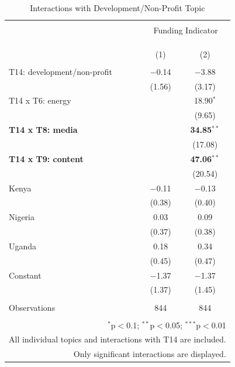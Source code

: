 \documentclass[12pt]{article}
\begin{document}
\begin{table}[!htbp] \centering 
  \caption{Interactions with Development/Non-Profit Topic} 
  \label{} 
\scriptsize 
\begin{tabular}{@{\extracolsep{5pt}}lcc} 
\\[-1.8ex]\hline 
\hline \\[-1.8ex] 
 & \multicolumn{2}{c}{Funding Indicator} \\ 
\cline{2-3} 
\\[-1.8ex] & \multicolumn{2}{c}{} \\ 
\\[-1.8ex] & (1) & (2)\\ 
\hline \\[-1.8ex] 
  T14: development/non-profit & $-$0.14 & $-$3.88 \\ 
  & (1.56) & (3.17) \\ 
  T14 x T6: energy &  & 18.90$^{*}$ \\ 
  &  & (9.65) \\ 
  \textbf{T14 x T8: media} &  & \textbf{34.85}$^{**}$ \\ 
  &  & (17.08) \\ 
   \textbf{T14 x T9: content} &  & \textbf{47.06}$^{**}$ \\ 
  &  & (20.54) \\ 
  Kenya & $-$0.11 & $-$0.13 \\ 
  & (0.38) & (0.40) \\ 
  Nigeria & 0.03 & 0.09 \\ 
  & (0.37) & (0.38) \\ 
  Uganda & 0.18 & 0.34 \\ 
  & (0.45) & (0.47) \\ 
  Constant & $-$1.37 & $-$1.37 \\ 
  & (1.37) & (1.45) \\ 
 \hline \\[-1.8ex] 
Observations & 844 & 844 \\ 
\hline 
\hline \\[-1.8ex] 
 \multicolumn{3}{r}{$^{*}$p$<$0.1; $^{**}$p$<$0.05; $^{***}$p$<$0.01} \\ 
 \multicolumn{3}{r}{ \scriptsize{All individual topics and interactions with T14 are included.}} \\ 
 \multicolumn{3}{r}{\scriptsize{Only significant interactions are displayed.}} \\ 
\end{tabular} 
\end{table} 
\end{document}
